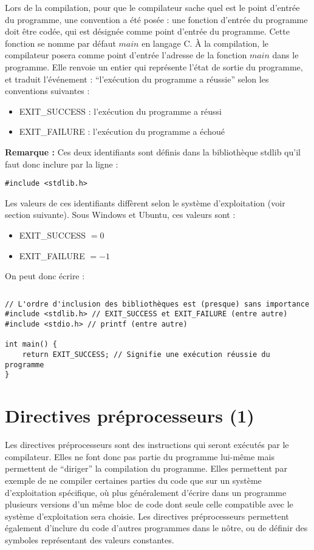 \documentclass[../../../main.tex]{subfiles}
\begin{document}
Lors de la compilation, pour que le compilateur sache quel est le point d'entrée du programme, une convention a été posée : une fonction d'entrée du programme doit être codée, qui est désignée comme point d'entrée du programme. Cette fonction se nomme par défaut $main$ en langage C. À la compilation, le compilateur posera comme point d'entrée l'adresse de la fonction $main$ dans le programme. Elle renvoie un entier qui représente l'état de sortie du programme, et traduit l'événement : ``l'exécution du programme a réussie'' selon les conventions suivantes :
\begin{itemize}
	\item \textsf{EXIT\_SUCCESS} : l'exécution du programme a réussi
	\item \textsf{EXIT\_FAILURE} : l'exécution du programme a échoué
\end{itemize}
\textbf{Remarque :} Ces deux identifiants sont définis dans la bibliothèque \textsf{stdlib} qu'il faut donc inclure par la ligne :
\begin{verbatim}
#include <stdlib.h>
\end{verbatim}
Les valeurs de ces identifiants diffèrent selon le système d'exploitation (voir section suivante). Sous Windows et Ubuntu, ces valeurs sont :
\begin{itemize}
	\item \textsf{EXIT\_SUCCESS} $ = 0$
	\item \textsf{EXIT\_FAILURE} $ = -1$
\end{itemize}
On peut donc écrire :
\begin{lstlisting}[title=Exemple]
\end{lstlisting}
\begin{verbatim}
// L'ordre d'inclusion des bibliothèques est (presque) sans importance
#include <stdlib.h> // EXIT_SUCCESS et EXIT_FAILURE (entre autre)
#include <stdio.h> // printf (entre autre)

int main() {
	return EXIT_SUCCESS; // Signifie une exécution réussie du programme
}
\end{verbatim}
\section{Directives préprocesseurs (1)}
Les directives préprocesseurs sont des instructions qui seront exécutés par le compilateur. Elles ne font donc pas partie du programme lui-même mais permettent de ``diriger'' la compilation du programme. Elles permettent par exemple de ne compiler certaines parties du code que sur un système d'exploitation spécifique, où plus généralement d'écrire dans un programme plusieurs versions d'un même bloc de code dont seule celle compatible avec le système d'exploitation sera choisie. Les directives préprocesseurs permettent également d'inclure du code d'autres programmes dans le nôtre, ou de définir des symboles représentant des valeurs constantes.
 
\end{document}
